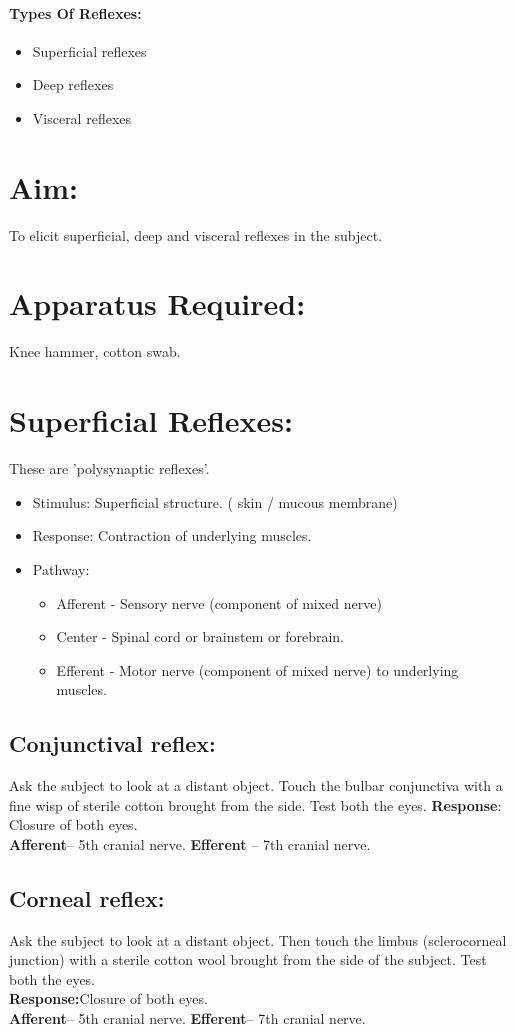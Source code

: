 \documentclass[a4paper,12pt,openany,oneside]{book}
\begin{document}
\paragraph{Types Of Reflexes:}
\begin{itemize}
\item{Superficial reflexes}
\item{Deep reflexes}
\item{Visceral reflexes}
\end{itemize}
\section*{Aim:} 
To elicit superficial, deep and visceral reflexes in the subject.
\section*{Apparatus Required:}
Knee hammer, cotton swab.
\section*{Superficial Reflexes: }
These are 'polysynaptic reflexes'.
\begin{itemize}
\item{Stimulus: Superficial structure. ( skin / mucous membrane)}
\item{Response: Contraction of underlying muscles.}
\item{Pathway:}
	\begin{itemize}
\item{Afferent - Sensory nerve (component of mixed nerve)}
\item{Center - Spinal cord or brainstem or forebrain.}
\item{Efferent - Motor nerve (component of mixed nerve) to underlying muscles.}
	\end{itemize}
\end{itemize}
\subsection*{Conjunctival reflex:}
	Ask the subject to look at a distant object. Touch the bulbar conjunctiva with a fine wisp of sterile cotton brought from the side. Test both the eyes.\newline
\textbf{Response}: Closure of both eyes.\\  
\textbf{Afferent}– 5th cranial nerve. \textbf{Efferent} – 7th cranial nerve.
\subsection*{Corneal reflex:}
Ask the subject to look at a distant object. Then touch the limbus (sclerocorneal junction) with a sterile cotton wool brought from the side of the subject. Test both the eyes.\\
\textbf{Response:}Closure of both eyes.\\
\textbf{Afferent}– 5th cranial nerve. \textbf{Efferent}– 7th cranial nerve.
\end{document}
